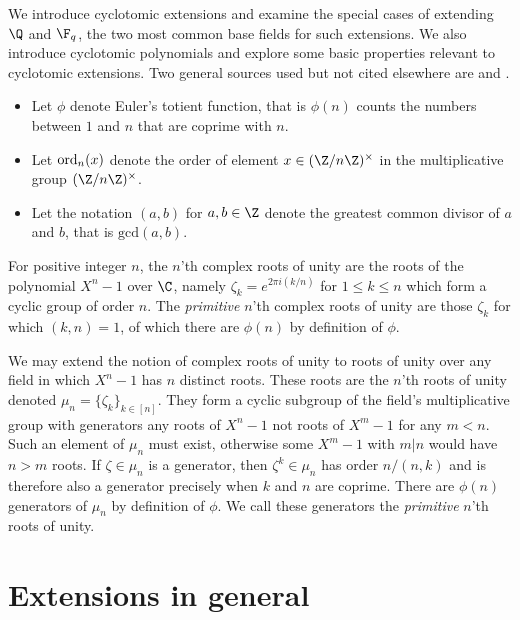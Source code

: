 
\begin{define}
    \newcommand\ord{\text{ord}}
    \newcommand\Gal{\text{Gal}}
\end{define}

We introduce cyclotomic extensions and examine the special cases of extending $\Q$ and $\F_q$, the two most common base fields for such extensions.
We also introduce cyclotomic polynomials and explore some basic properties relevant to cyclotomic extensions.
Two general sources used but not cited elsewhere are \cite{Mor96} and \cite{Conrad}.

\begin{itemize}
    \item
    Let $\phi$ denote Euler's totient function, that is $\phi(n)$ counts the numbers between $1$ and $n$ that are coprime with $n$.
    \item
    Let $\ord_n(x)$ denote the order of element $x\in(\Z/n\Z)^\times$ in the multiplicative group $(\Z/n\Z)^\times$.
    \item
    Let the notation $(a,b)$ for $a,b\in\Z$ denote the greatest common divisor of $a$ and $b$, that is $\text{gcd}(a,b)$.
\end{itemize}

For positive integer $n$, the $n$'th complex roots of unity are the roots of the polynomial $X^n-1$ over $\C$, namely $\zeta_k = e^{2\pi i(k/n)}$ for $1\leq k\leq n$ which form a cyclic group of order $n$.
The \emph{primitive} $n$'th complex roots of unity are those $\zeta_k$ for which $(k,n)=1$, of which there are $\phi(n)$ by definition of $\phi$.

We may extend the notion of complex roots of unity to roots of unity over any field in which $X^n-1$ has $n$ distinct roots.
These roots are the  $n$'th roots of unity denoted $\mu_n=\{\zeta_k\}_{k\in[n]}$.
They form a cyclic subgroup of the field's multiplicative group with generators any roots of $X^n-1$ not roots of $X^m-1$ for any $m<n$.
Such an element of $\mu_n$ must exist, otherwise some $X^m-1$ with $m|n$ would have $n>m$ roots.
If $\zeta\in\mu_n$ is a generator, then $\zeta^k\in\mu_n$ has order $n/(n,k)$ and is therefore also a generator precisely when $k$ and $n$ are coprime.
There are $\phi(n)$ generators of $\mu_n$ by definition of $\phi$.
We call these generators the \emph{primitive} $n$'th roots of unity.


\section{Extensions in general}

